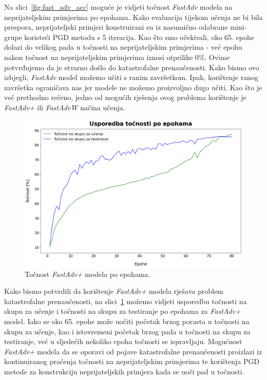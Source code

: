 \documentclass[times, utf8, zavrsni, numeric]{fer}
\begin{document}
\pagebreak

Na slici~\ref{fig:fast_adv_acc} moguće je vidjeti točnost \textit{FastAdv} modela na neprijateljskim primjerima po epohama.
Kako evaluacija tijekom učenja ne bi bila prespora, neprijateljski primjeri konstruirani su iz nasumično odabrane mini-grupe koristeći PGD metodu s 5 iteracija.
Kao što smo očekivali, oko 65. epohe dolazi do velikog pada u točnosti na neprijateljskim primjerima - već epohu nakon točnost na neprijateljskim primjerima iznosi otprilike $0\%$.
Ovime potvrđujemo da je stvarno došlo do katastrofalne prenaučenosti. Kako bismo ovo izbjegli, \textit{FastAdv} model možemo učiti s ranim završetkom. 
Ipak, korištenje ranog završetka ograničava nas jer modele ne možemo proizvoljno dugo učiti. 
Kao što je već prethodno rečeno, jedno od mogućih rješenja ovog problema korištenje je \textit{FastAdv+} ili \textit{FastAdvW} načina učenja.

\begin{figure}[htb]
    \centering
    \includegraphics[scale=0.41]{../stats/resnet18_fast+_epochs_80_lr_0.2_early/accuracies.png}
    \caption{Točnost \textit{FastAdv+} modela po epohama.}
    \label{fig:fast_plus_acc}
\end{figure}

Kako bismo potvrdili da korištenje \textit{FastAdv+} modela rješava problem katastrofalne prenaučenosti, 
na slici~\ref{fig:fast_plus_acc} možemo vidjeti usporedbu točnosti na skupu za učenje i točnosti na skupu za testiranje po epohama za \textit{FastAdv+} model.
Iako se oko 65. epohe može uočiti početak brzog porasta u točnosti na skupu za učenje, kao i istovremeni početak brzog pada u točnosti na skupu za testiranje,
već u sljedećih nekoliko epoha točnosti se ispravljaju. 
Mogućnost \textit{FastAdv+} modela da se oporavi od pojave katastrofalne prenaučenosti proizlazi iz kontinuiranog praćenja točnosti na neprijateljskim primjerima 
te korištenja PGD metode za konstrukciju neprijateljskih primjera kada se uoči pad u točnosti.
\end{document}
